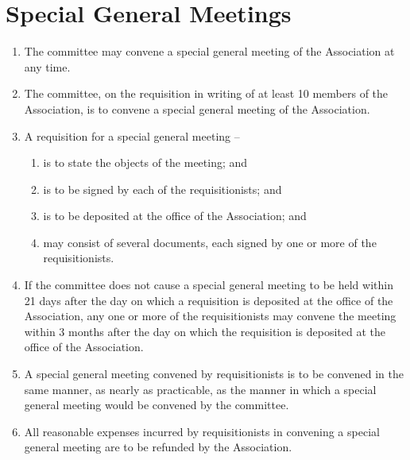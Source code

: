 \section{Special General Meetings}
\label{rule:sgm}

\begin{enumerate}
	\item The committee may convene a special general meeting of the Association at any time.
	\item The committee, on the requisition in writing of at least 10 members of the Association, is to convene a special general meeting of the Association.
	
	\item A requisition for a special general meeting --
	\begin{enumerate}
		\item is to state the objects of the meeting; and
		\item is to be signed by each of the requisitionists; and
		\item is to be deposited at the office of the Association; and
		\item may consist of several documents, each signed by one or more of the requisitionists.
	\end{enumerate}
	
	\item If the committee does not cause a special general meeting to be held within 21 days after the day on which a requisition is deposited at the office of the Association, any one or more of the requisitionists may convene the meeting within 3 months after the day on which the requisition is deposited at the office of the Association.
	\item A special general meeting convened by requisitionists is to be convened in the same manner, as nearly as practicable, as the manner in which a special general meeting would be convened by the committee.
	\item All reasonable expenses incurred by requisitionists in convening a special general meeting are to be refunded by the Association.
\end{enumerate}